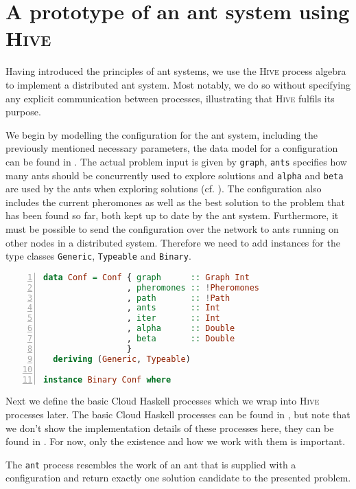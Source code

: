 \section{A prototype of an ant system using \textsc{Hive}}
Having introduced the principles of ant systems, we use the \textsc{Hive} process algebra to implement a distributed ant system. Most notably, we do so without specifying any explicit communication between processes, illustrating that \textsc{Hive} fulfils its purpose.

We begin by modelling the configuration for the ant system, including the previously mentioned necessary parameters, the data model for a configuration can be found in . The actual problem input is given by \texttt{graph}, \texttt{ants} specifies how many ants should be concurrently used to explore solutions and \texttt{alpha} and \texttt{beta} are used by the ants when exploring solutions (cf. ). The configuration also includes the current pheromones as well as the best solution to the problem that has been found so far, both kept up to date by the ant system. Furthermore, it must be possible to send the configuration over the network to ants running on other nodes in a distributed system. Therefore we need to add instances for the type classes \texttt{Generic}, \texttt{Typeable} and \texttt{Binary}.

\begin{lstlisting}[language=Haskell,frame=tb,numbers=left,label=lst:ant_conf,caption=Configuration for the ant system.]
data Conf = Conf { graph      :: Graph Int
                 , pheromones :: !Pheromones
                 , path       :: !Path
                 , ants       :: Int
                 , iter       :: Int
                 , alpha      :: Double
                 , beta       :: Double
                 }
  deriving (Generic, Typeable)

instance Binary Conf where
\end{lstlisting}

Next we define the basic \textsf{Cloud Haskell} processes which we wrap into \textsc{Hive} processes later. The basic \textsf{Cloud Haskell} processes can be found in , but note that we don't show the implementation details of these processes here, they can be found in . For now, only the existence and how we work with them is important.

The \texttt{ant} process resembles the work of an ant that is supplied with a configuration and return exactly one solution candidate to the presented problem.

